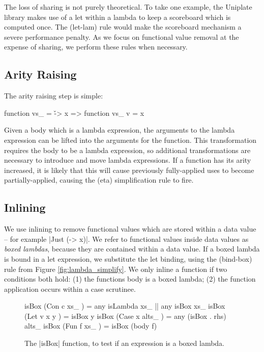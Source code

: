 \documentclass[preprint]{sigplanconf}
\begin{document}
The loss of sharing is not purely theoretical. To take one example, the Uniplate library \cite{me:uniplate} makes use of a let within a lambda to keep a scoreboard which is computed once. The (let-lam) rule would make the scoreboard mechanism a severe performance penalty. As we focus on functional value removal at the expense of sharing, we perform these rules when necessary.


\subsection{Arity Raising}

The arity raising step is simple:

\begin{code}
function vs_ = \v -> x
    => function vs_ v = x
\end{code}

Given a body which is a lambda expression, the arguments to the lambda expression can be lifted into the arguments for the function. This transformation requires the body to be a lambda expression, so additional transformations are necessary to introduce and move lambda expressions. If a function has its arity increased, it is likely that this will cause previously fully-applied uses to become partially-applied, causing the (eta) simplification rule to fire.


\subsection{Inlining}
\label{sec:inlining}

We use inlining to remove functional values which are stored within a data value -- for example |Just (\x -> x)|. We refer to functional values inside data values as \textit{boxed lambdas}, because they are contained within a data value. If a boxed lambda is bound in a let expression, we substitute the let binding, using the (bind-box) rule from Figure \ref{fig:lambda_simplify}. We only inline a function if two conditions both hold: (1) the functions body is a boxed lambda; (2) the function application occurs within a case scrutinee.

\begin{figure}
\begin{code}
isBox (Con c xs_     )  =   any isLambda xs_ ||  any isBox xs_
isBox (Let v x y     )  =   isBox y
isBox (Case x alts_  )  =   any (isBox . rhs) alts_
isBox (Fun f xs_     )  =   isBox (body f)
\end{code}
\caption{The |isBox| function, to test if an expression is a boxed lambda.}
\label{fig:boxed_lambda}
\end{figure}
\end{document}
